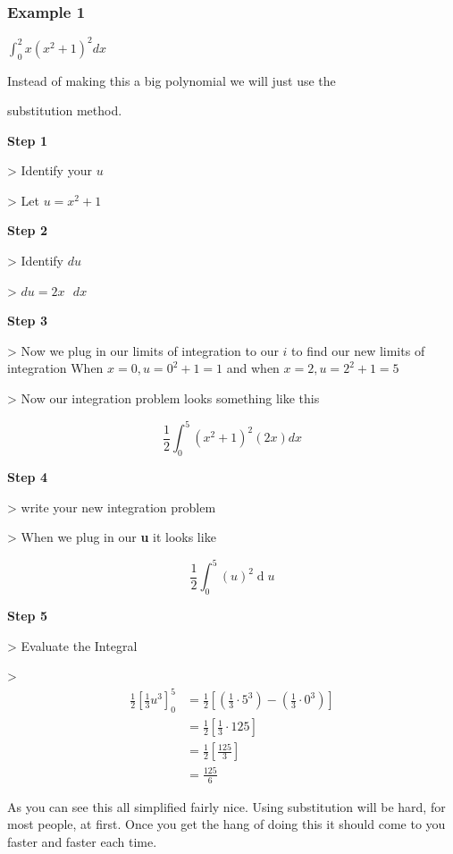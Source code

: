 \subsubsection{Example 1}
\label{sss:exam-acc3}


$\int _{0}^{2} x(x^2+1)^2 dx$


Instead of making this a big polynomial we will just use the

substitution method.


\textbf{Step 1}


> Identify your $u$


> Let $u = x^2+1$


\textbf{Step 2}


> Identify $du$


> $du=2x \text{ } dx$


\textbf{Step 3}


> Now we plug in our limits of integration to our $i$ to find our new limits of integration When $x = 0, u =0^2 + 1 = 1$ and when $x = 2, u = 2^2 + 1 = 5$


> Now our integration problem looks something like this


\[
\frac{1}{2} \int _{0}^{5} (x^2 + 1)^2 (2x)dx
\]


\textbf{Step 4}


> write your new integration problem


> When we plug in our \textbf{u} it looks like


\[
\frac {1}{2} \int _{0}^{5} (u)^2 \operatorname {d}u
\]


\textbf{Step 5}


> Evaluate the Integral

> \begin{align}
\frac{1}{2} \left[\frac{1}{3} u^3 \right] _{0}^{5} 
&= \frac{1}{2} \left[\left(\frac{1}{3} \cdot 5^3 \right) - \left(\frac{1}{3} \cdot 0^3 \right)\right] \\&= \frac{1}{2} \left[\frac{1}{3} \cdot 125 \right] \\&= \frac{1}{2} \left[\frac{125}{3}\right] \\&= \frac{125}{6}
\end{align}


As you can see this all simplified fairly nice. Using substitution will be hard, for most people, at first. Once you get the hang of doing this it should come to you faster and faster each time.


